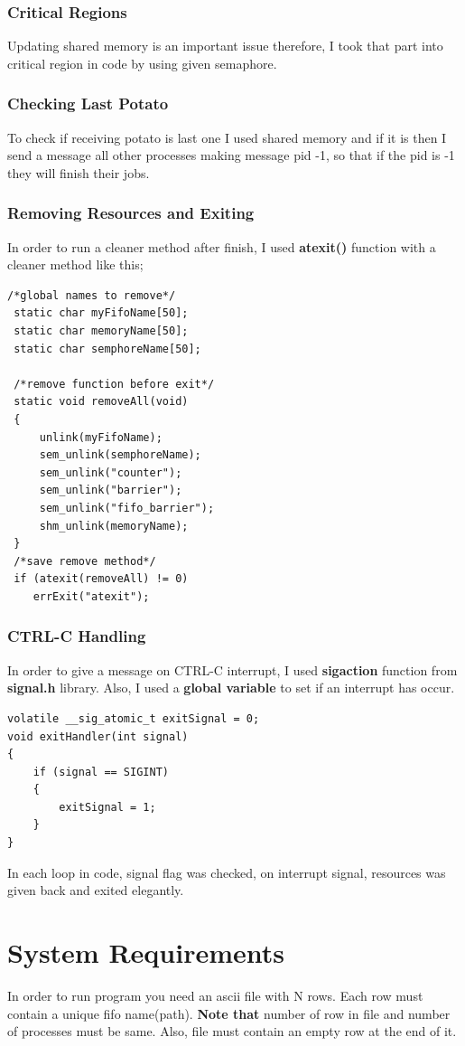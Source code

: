\documentclass{article}
\begin{document}
\subsubsection{Critical Regions}
Updating shared memory is an important issue therefore, I took that part into critical region in code by using given semaphore.
\subsubsection{Checking Last Potato}
To check if receiving potato is last one I used shared memory and if it is then I send a message all other processes making message pid -1,
so that if the pid is -1 they will finish their jobs.
\subsubsection{Removing Resources and Exiting}
In order to run a cleaner method after finish, I used \textbf{atexit()} function with a cleaner method like this;
\begin{lstlisting}[style=CStyle]
 /*global names to remove*/
 static char myFifoName[50];
 static char memoryName[50];
 static char semphoreName[50];

 /*remove function before exit*/
 static void removeAll(void)
 {
     unlink(myFifoName);
     sem_unlink(semphoreName);
     sem_unlink("counter");
     sem_unlink("barrier");
     sem_unlink("fifo_barrier");
     shm_unlink(memoryName);
 }
 /*save remove method*/
 if (atexit(removeAll) != 0)
    errExit("atexit");
\end{lstlisting}

\subsubsection{CTRL-C Handling}
In order to give a message on CTRL-C interrupt, I used \textbf{sigaction} function from \textbf{signal.h} library.
Also, I used a \textbf{global variable} to set if an interrupt has occur.
\begin{lstlisting}[style=CStyle]
volatile __sig_atomic_t exitSignal = 0;
void exitHandler(int signal)
{
    if (signal == SIGINT)
    {
        exitSignal = 1;
    }
}
\end{lstlisting}
In each loop in code, signal flag was checked, on interrupt signal, resources was given back and exited elegantly.
\section{System Requirements}
In order to run program you need an ascii file with N rows. Each row must contain a unique fifo name(path).
\textbf{Note that} number of row in file and number of processes must be same. Also, file must contain an empty row at the end of it.
\end{document}
